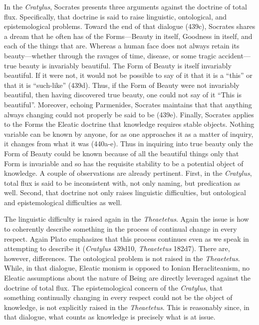 In the \emph{Cratylus}, Socrates presents three arguments against the doctrine of total flux. Specifically, that doctrine is said to raise linguistic, ontological, and epistemological problems. Toward the end of that dialogue (439c), Socrates shares a dream that he often has of the Forms---Beauty in itself, Goodness in itself, and each of the things that are. Whereas a human face does not always retain its beauty---whether through the ravages of time, disease, or some tragic accident---true beauty is invariably beautiful. The Form of Beauty is itself invariably beautiful. If it were not, it would not be possible to say of it that it is a ``this'' or that it is ``such-like'' (439d). Thus, if the Form of Beauty were not invariably beautiful, then having discovered true beauty, one could not say of it ``This is beautiful''.  Moreover, echoing Parmenides, Socrates maintains that that anything always changing could not properly be said to be (439e). Finally, Socrates applies to the Forms the Eleatic doctrine that knowledge requires stable objects. Nothing variable can be known by anyone, for as one approaches it as a matter of inquiry, it changes from what it was (440a-e). Thus in inquiring into true beauty only the Form of Beauty could be known because of all the beautiful things only that Form is invariable and so has the requisite stability to be a potential object of knowledge. A couple of observations are already pertinent. First, in the \emph{Cratylus}, total flux is said to be inconsistent with, not only naming, but predication as well. Second, that doctrine not only raises linguistic difficulties, but ontological and epistemological difficulties as well.

The linguistic difficulty is raised again in the \emph{Theaetetus}. Again the issue is how to coherently describe something in the process of continual change in every respect. Again Plato emphasizes that this process continues even as we speak in attempting to describe it (\emph{Cratylus} 439d10, \emph{Theaetetus} 182d7). There are, however, differences. The ontological problem is not raised in the \emph{Theaetetus}. While, in that dialogue, Eleatic monism is opposed to Ionian Heracliteanism, no Eleatic assumptions about the nature of Being are directly leveraged against the doctrine of total flux. The epistemological concern of the \emph{Cratylus}, that something continually changing in every respect could not be the object of knowledge, is not explicitly raised in the \emph{Theaetetus}. This is reasonably since, in that dialogue, what counts as knowledge is precisely what is at issue. 

